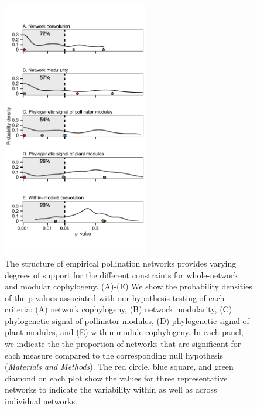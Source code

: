 \documentclass{article}
\begin{document}
\begin{figure}[ht]
\centerline{\includegraphics*[width=0.57\textwidth]{fig_netresults}}
\caption{The structure of empirical pollination networks provides varying degrees of support for the different constraints for whole-network and modular cophylogeny. (A)-(E) We show the probability densities of the p-values associated with our hypothesis testing of each criteria: (A) network cophylogeny, (B) network modularity, (C) phylogenetic signal of pollinator modules, (D) phylogenetic signal of plant modules, and (E) within-module cophylogeny.
In each panel, we indicate the the proportion of networks that are significant for each measure compared to the corresponding null hypothesis (\emph{Materials and Methods}). The red circle, blue square, and green diamond on each plot show the values for three representative networks to indicate the variability within as well as across individual networks.}
\label{fig:p-values}
\end{figure}
\clearpage
\end{document}

